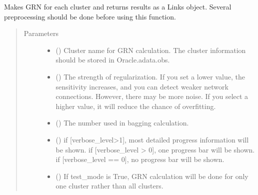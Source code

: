 \documentclass[letterpaper,10pt,english]{sphinxmanual}
\begin{document}
\begin{fulllineitems}
\begin{fulllineitems}
\label{\detokenize{modules/celloracle:celloracle.Oracle.get_links}}
Makes GRN for each cluster and returns results as a Links object.
Several preprocessing should be done before using this function.
\begin{quote}\begin{description}
\item[{Parameters}] \leavevmode\begin{itemize}
\item {} 
 () \textendash{} Cluster name for GRN calculation. The cluster information should be stored in Oracle.adata.obs.

\item {} 
 () \textendash{} The strength of regularization.
If you set a lower value, the sensitivity increases, and you can detect weaker network connections. However, there may be more noise.
If you select a higher value, it will reduce the chance of overfitting.

\item {} 
 () \textendash{} The number used in bagging calculation.

\item {} 
 () \textendash{} if {[}verbose\_level\textgreater{}1{]}, most detailed progress information will be shown.
if {[}verbose\_level \textgreater{} 0{]}, one progress bar will be shown.
if {[}verbose\_level == 0{]}, no progress bar will be shown.

\item {} 
 () \textendash{} If test\_mode is True, GRN calculation will be done for only one cluster rather than all clusters.

\end{itemize}


\end{description}
\end{quote}
\end{fulllineitems}
\end{fulllineitems}
\end{document}

